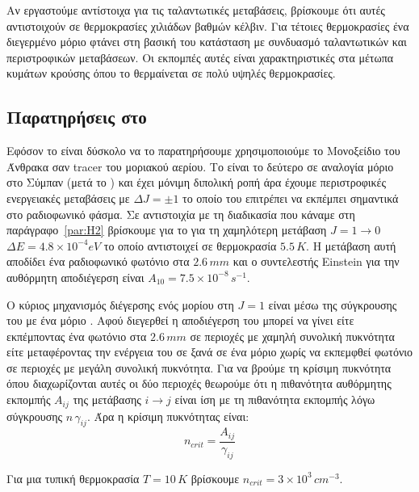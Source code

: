 \documentclass[a4paper,11pt]{memoir}
\begin{document}
Αν εργαστούμε αντίστοιχα για τις ταλαντωτικές μεταβάσεις, βρίσκουμε ότι αυτές αντιστοιχούν σε θερμοκρασίες χιλιάδων βαθμών κέλβιν. Για τέτοιες θερμοκρασίες ένα διεγερμένο μόριο  φτάνει στη βασική του κατάσταση με συνδυασμό ταλαντωτικών και περιστροφικών μεταβάσεων. Οι εκπομπές αυτές είναι χαρακτηριστικές στα μέτωπα κυμάτων κρούσης όπου το  θερμαίνεται σε πολύ υψηλές θερμοκρασίες.

\subsection{Παρατηρήσεις στο  }
Εφόσον το  είναι δύσκολο να το παρατηρήσουμε χρησιμοποιούμε το Μονοξείδιο του Άνθρακα  σαν tracer  του μοριακού αερίου. Το  είναι το δεύτερο σε αναλογία μόριο στο Σύμπαν (μετά το ) και έχει μόνιμη διπολική ροπή άρα έχουμε περιστροφικές ενεργειακές μεταβάσεις με $\Delta J=\pm 1$ το οποίο του επιτρέπει να εκπέμπει σημαντικά στο ραδιοφωνικό φάσμα. 
Σε αντιστοιχία με τη διαδικασία που κάναμε στη παράγραφο~\ref{par:H2} βρίσκουμε για το  για τη χαμηλότερη μετάβαση $J=1\rightarrow 0$ $\Delta E=4.8\times 10^{-4} eV$ το οποίο αντιστοιχεί σε θερμοκρασία $5.5 \, K$. Η μετάβαση αυτή αποδίδει ένα ραδιοφωνικό φωτόνιο στα $2.6 \, mm$ και ο συντελεστής Einstein για την αυθόρμητη αποδιέγερση είναι $A_{10}=7.5\times 10^{-8} \, s^{-1}$.

Ο κύριος μηχανισμός διέγερσης ενός μορίου  στη $J=1$ είναι μέσω της σύγκρουσης του με ένα μόριο . Αφού διεγερθεί η αποδιέγερση του μπορεί να γίνει είτε εκπέμποντας ένα φωτόνιο στα $2.6 \, mm$ σε περιοχές με χαμηλή συνολική πυκνότητα είτε μεταφέροντας την ενέργεια του σε ξανά σε ένα μόριο  χωρίς να εκπεμφθεί φωτόνιο σε περιοχές με μεγάλη συνολική πυκνότητα. Για να βρούμε τη κρίσιμη πυκνότητα όπου διαχωρίζονται αυτές οι δύο περιοχές θεωρούμε ότι η πιθανότητα αυθόρμητης εκπομπής $A_{ij}$ της μετάβασης $i\rightarrow j$ είναι ίση με τη πιθανότητα εκπομπής λόγω σύγκρουσης $n \, \gamma _{ij}$. Άρα η κρίσιμη πυκνότητας είναι:
\begin{equation}
n_{crit}=\frac{A_{ij}}{\gamma _{ij}}
\end{equation} 

Για μια τυπική θερμοκρασία $T=10 \, K$ βρίσκουμε $n_{crit}=3\times 10^3 \,cm^{-3}$.




\end{document}
